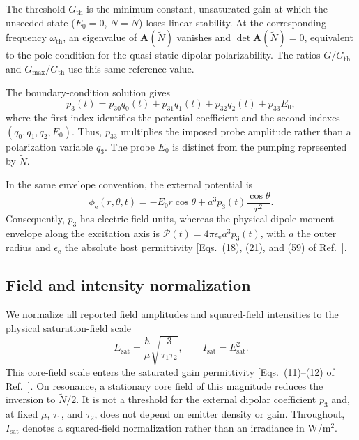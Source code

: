 \documentclass{optica-article}
\begin{document}
The threshold $G_{\mathrm{th}}$ is the minimum constant, unsaturated gain at which the unseeded state ($E_0=0$, $N=\widetilde N$) loses linear stability. At the corresponding frequency $\omega_{\mathrm{th}}$, an eigenvalue of $\mathbf A(\widetilde N)$ vanishes and $\det\mathbf A(\widetilde N)=0$, equivalent to the pole condition for the quasi-static dipolar polarizability.  The ratios $G/G_{\mathrm{th}}$ and $G_{\max}/G_{\mathrm{th}}$ use this same reference value.

The boundary-condition solution gives
\begin{equation}
p_3(t)=p_{30}q_0(t)+p_{31}q_1(t)+p_{32}q_2(t)+p_{33}E_0,
\label{eq:p3_coefficients}
\end{equation}
where the first index identifies the potential coefficient and the second indexes $(q_0,q_1,q_2,E_0)$. Thus, $p_{33}$ multiplies the imposed probe amplitude rather than a polarization variable $q_3$. The probe $E_0$ is distinct from the pumping represented by $\widetilde N$.

In the same envelope convention, the external potential is
\begin{equation}
\phi_{\mathrm e}(r,\theta,t)=-E_0r\cos\theta
+a^3p_3(t)\frac{\cos\theta}{r^2}.
\label{eq:external_potential}
\end{equation}
Consequently, $p_3$ has electric-field units, whereas the physical dipole-moment envelope along the excitation axis is $\mathcal P(t)=4\pi\epsilon_{\mathrm e}a^3p_3(t)$, with $a$ the outer radius and $\epsilon_{\mathrm e}$ the absolute host permittivity [Eqs.~(18), (21), and (59) of Ref.~\cite{Aradian:2024}].

\subsection{Field and intensity normalization}
\label{sec:normalization}

We normalize all reported field amplitudes and squared-field intensities to the physical saturation-field scale
\begin{equation}
E_{\mathrm{sat}}=\frac{\hbar}{\mu}\sqrt{\frac{3}{\tau_1\tau_2}},
\qquad I_{\mathrm{sat}}=E_{\mathrm{sat}}^2.
\label{eq:saturation_scale}
\end{equation}
This core-field scale enters the saturated gain permittivity [Eqs.~(11)--(12) of Ref.~\cite{Aradian:2024}]. On resonance, a stationary core field of this magnitude reduces the inversion to $\widetilde N/2$. It is not a threshold for the external dipolar coefficient $p_3$ and, at fixed $\mu$, $\tau_1$, and $\tau_2$, does not depend on emitter density or gain. Throughout, $I_{\mathrm{sat}}$ denotes a squared-field normalization rather than an irradiance in W/m$^2$.
\end{document}
